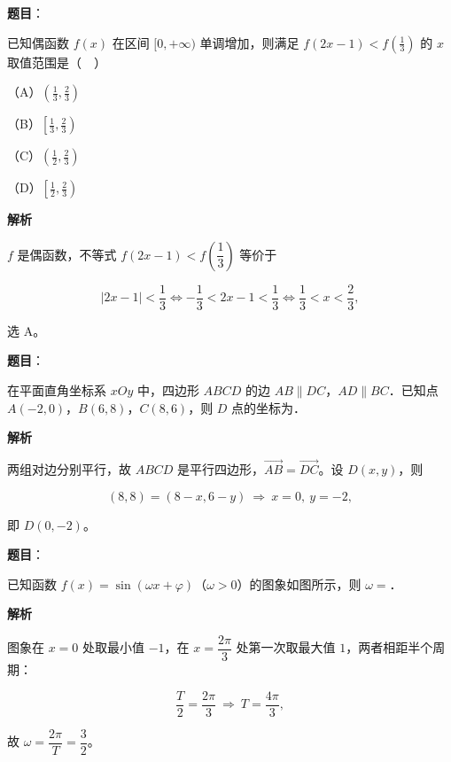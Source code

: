 \begin{answer}

\textbf{题目}：

已知偶函数 $f(x)$ 在区间 $[0,+\infty)$ 单调增加，则满足 $f(2x-1)<f\left(\frac13\right)$ 的 $x$ 取值范围是（　）

（A）$\left(\frac13,\frac23\right)$

（B）$\left[\frac13,\frac23\right)$

（C）$\left(\frac12,\frac23\right)$

（D）$\left[\frac12,\frac23\right)$

\textbf{解析}

$f$ 是偶函数，不等式 $f(2x-1)<f\left(\dfrac13\right)$ 等价于

\nopagebreak[4]
\[|2x-1|<\frac13\iff-\frac13<2x-1<\frac13\iff\frac13<x<\frac23,\]

选 A。


\end{answer}
\begin{answer}

\textbf{题目}：

在平面直角坐标系 $xOy$ 中，四边形 $ABCD$ 的边 $AB\parallel DC$，$AD\parallel BC$．已知点 $A(-2,0)$，$B(6,8)$，$C(8,6)$，则 $D$ 点的坐标为\gkblank{}．

\textbf{解析}

两组对边分别平行，故 $ABCD$ 是平行四边形，$\overrightarrow{AB}=\overrightarrow{DC}$。设 $D(x,y)$，则

\nopagebreak[4]
\[(8,8)=(8-x,6-y)\ \Longrightarrow\ x=0,\ y=-2,\]

即 $D(0,-2)$。


\end{answer}
\begin{answer}

\textbf{题目}：

已知函数 $f(x)=\sin(\omega x+\varphi)$（$\omega>0$）的图象如图所示，则 $\omega=$\gkblank{}．
\nopagebreak[4]
\begin{center}\end{center}
\nopagebreak[4]
\textbf{解析}

图象在 $x=0$ 处取最小值 $-1$，在 $x=\dfrac{2\pi}{3}$ 处第一次取最大值 $1$，两者相距半个周期：

\nopagebreak[4]
\[\frac T2=\frac{2\pi}{3}\ \Longrightarrow\ T=\frac{4\pi}{3},\]

故 $\omega=\dfrac{2\pi}{T}=\dfrac32$。


\end{answer}
